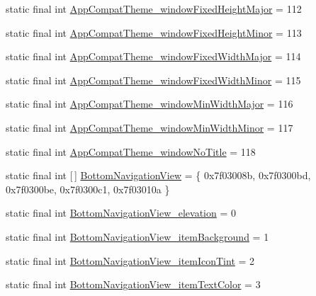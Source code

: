 \begin{DoxyCompactItemize}
\item 
static final int \mbox{\hyperlink{classandroid_1_1support_1_1design_1_1R_1_1styleable_a5959da74bb48f413fc6dfea1f50b33f1}{App\+Compat\+Theme\+\_\+window\+Fixed\+Height\+Major}} = 112
\item 
static final int \mbox{\hyperlink{classandroid_1_1support_1_1design_1_1R_1_1styleable_ac6eae65ae97acad480e341c691e1e0e3}{App\+Compat\+Theme\+\_\+window\+Fixed\+Height\+Minor}} = 113
\item 
static final int \mbox{\hyperlink{classandroid_1_1support_1_1design_1_1R_1_1styleable_ac6994b7c630468c6c2ab7a17ed937160}{App\+Compat\+Theme\+\_\+window\+Fixed\+Width\+Major}} = 114
\item 
static final int \mbox{\hyperlink{classandroid_1_1support_1_1design_1_1R_1_1styleable_a55ab1d572447b2b5a3dac90de5aaeda7}{App\+Compat\+Theme\+\_\+window\+Fixed\+Width\+Minor}} = 115
\item 
static final int \mbox{\hyperlink{classandroid_1_1support_1_1design_1_1R_1_1styleable_ab1e522f74f4fa686373e34b0ad189b10}{App\+Compat\+Theme\+\_\+window\+Min\+Width\+Major}} = 116
\item 
static final int \mbox{\hyperlink{classandroid_1_1support_1_1design_1_1R_1_1styleable_a4950ed5e7732a327332cea3555f2acc7}{App\+Compat\+Theme\+\_\+window\+Min\+Width\+Minor}} = 117
\item 
static final int \mbox{\hyperlink{classandroid_1_1support_1_1design_1_1R_1_1styleable_a7f38f8c63670995f4f038c7be8cc6054}{App\+Compat\+Theme\+\_\+window\+No\+Title}} = 118
\item 
static final int \mbox{[}$\,$\mbox{]} \mbox{\hyperlink{classandroid_1_1support_1_1design_1_1R_1_1styleable_a172fd3fafa033a32b591f783f5794d3e}{Bottom\+Navigation\+View}} = \{ 0x7f03008b, 0x7f0300bd, 0x7f0300be, 0x7f0300c1, 0x7f03010a \}
\item 
static final int \mbox{\hyperlink{classandroid_1_1support_1_1design_1_1R_1_1styleable_a0967c8e2a809d8a08e983b3a70a13ab1}{Bottom\+Navigation\+View\+\_\+elevation}} = 0
\item 
static final int \mbox{\hyperlink{classandroid_1_1support_1_1design_1_1R_1_1styleable_a03151091a8b9f1439495dccf695424de}{Bottom\+Navigation\+View\+\_\+item\+Background}} = 1
\item 
static final int \mbox{\hyperlink{classandroid_1_1support_1_1design_1_1R_1_1styleable_a26afc659fa7b05094ab53ad2633c39ad}{Bottom\+Navigation\+View\+\_\+item\+Icon\+Tint}} = 2
\item 
static final int \mbox{\hyperlink{classandroid_1_1support_1_1design_1_1R_1_1styleable_a7633cb42f2cb714be7efeb16c2f75c9b}{Bottom\+Navigation\+View\+\_\+item\+Text\+Color}} = 3

\end{DoxyCompactItemize}
